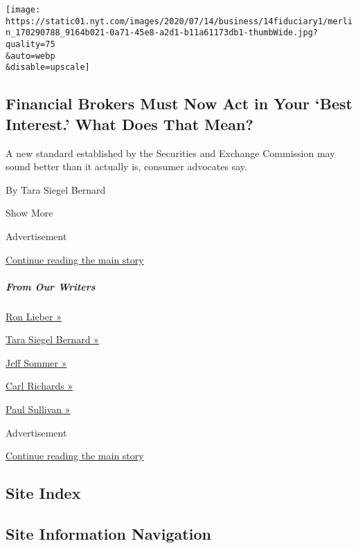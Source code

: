\begin{enumerate}
  \texttt{[image: https://static01.nyt.com/images/2020/07/14/business/14fiduciary1/merlin\_170290788\_9164b021-0a71-45e8-a2d1-b11a61173db1-thumbWide.jpg?quality=75\\\&auto=webp\\\&disable=upscale]}

  \hypertarget{financial-brokers-must-now-act-in-your-best-interest-what-does-that-mean}{%
  \subsection{Financial Brokers Must Now Act in Your `Best Interest.'
  What Does That
  Mean?}\label{financial-brokers-must-now-act-in-your-best-interest-what-does-that-mean}}

  A new standard established by the Securities and Exchange Commission
  may sound better than it actually is, consumer advocates say.

  By Tara Siegel Bernard
\end{enumerate}

Show More

Advertisement

\protect\hyperlink{after-mid1}{Continue reading the main story}

\hypertarget{from-our-writers}{%
\subparagraph{From Our Writers}\label{from-our-writers}}

\href{https://www.nytimes.com/by/ron-lieber}{Ron Lieber »}

\href{https://www.nytimes.com/by/tara-siegel-bernard}{Tara Siegel
Bernard »}

\href{https://www.nytimes.com/by/jeff-sommer}{Jeff Sommer »}

\href{https://www.nytimes.com/by/carl-richards}{Carl Richards »}

\href{https://www.nytimes.com/column/wealth-matters}{Paul Sullivan »}

Advertisement

\protect\hyperlink{after-mktg}{Continue reading the main story}

\hypertarget{site-index}{%
\subsection{Site Index}\label{site-index}}

\hypertarget{site-information-navigation}{%
\subsection{Site Information
Navigation}\label{site-information-navigation}}

